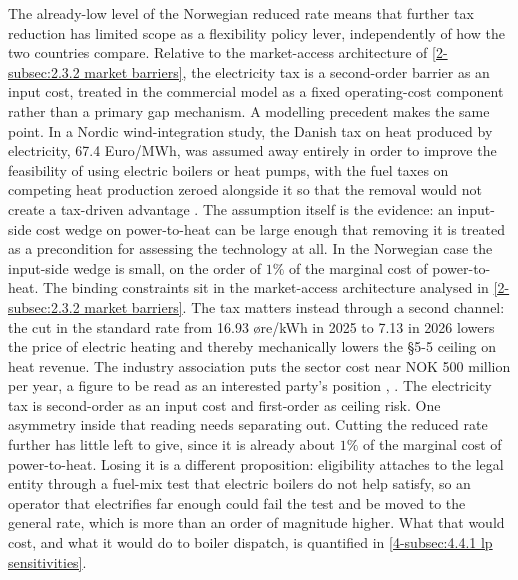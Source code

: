 The already-low level of the Norwegian reduced rate means that further tax reduction has limited scope as a flexibility policy lever, independently of how the two countries compare. Relative to the market-access architecture of \autoref{2-subsec:2.3.2 market barriers}, the electricity tax is a second-order barrier as an input cost, treated in the commercial model as a fixed operating-cost component rather than a primary gap mechanism. A modelling precedent makes the same point. In a Nordic wind-integration study, the Danish tax on heat produced by electricity, 67.4 Euro/MWh, was assumed away entirely in order to improve the feasibility of using electric boilers or heat pumps, with the fuel taxes on competing heat production zeroed alongside it so that the removal would not create a tax-driven advantage \cite{meibom_value_2007}. The assumption itself is the evidence: an input-side cost wedge on power-to-heat can be large enough that removing it is treated as a precondition for assessing the technology at all. In the Norwegian case the input-side wedge is small, on the order of $1\%$ of the marginal cost of power-to-heat. The binding constraints sit in the market-access architecture analysed in \autoref{2-subsec:2.3.2 market barriers}. The tax matters instead through a second channel: the cut in the standard rate from 16.93 øre/kWh in 2025 to 7.13 in 2026 lowers the price of electric heating and thereby mechanically lowers the §5-5 ceiling on heat revenue. The industry association puts the sector cost near NOK 500 million per year, a figure to be read as an interested party's position \cite{norsk_fjernvarme_fakta_nodate}, \cite{norsk_fjernvarme_fjernkontrollenno_nodate}. The electricity tax is second-order as an input cost and first-order as ceiling risk. One asymmetry inside that reading needs separating out. Cutting the reduced rate further has little left to give, since it is already about $1\%$ of the marginal cost of power-to-heat. Losing it is a different proposition: eligibility attaches to the legal entity through a fuel-mix test that electric boilers do not help satisfy, so an operator that electrifies far enough could fail the test and be moved to the general rate, which is more than an order of magnitude higher. What that would cost, and what it would do to boiler dispatch, is quantified in \autoref{4-subsec:4.4.1 lp sensitivities}.

